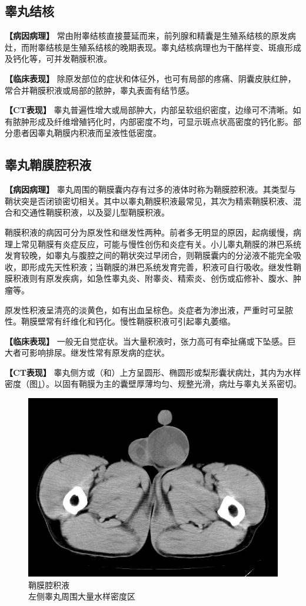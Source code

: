 \subsection{睾丸结核}

\textbf{【病因病理】}
常由附睾结核直接蔓延而来，前列腺和精囊是生殖系结核的原发病灶，而附睾结核是生殖系结核的晚期表现。睾丸结核病理也为干酪样变、斑痕形成及钙化等，可并发鞘膜积液。

\textbf{【临床表现】}
除原发部位的症状和体征外，也可有局部的疼痛、阴囊皮肤红肿，常合并鞘膜积液或局部的脓肿，睾丸表面有结节感。

\textbf{【CT表现】}
睾丸普遍性增大或局部肿大，内部呈软组织密度，边缘可不清晰。如有脓肿形成及纤维增殖钙化时，内部密度不均，可显示斑点状高密度的钙化影。部分患者因睾丸鞘膜内积液而呈液性低密度。

\subsection{睾丸鞘膜腔积液}

\textbf{【病因病理】}
睾丸周围的鞘膜囊内存有过多的液体时称为鞘膜腔积液。其类型与鞘状突是否闭锁密切相关。其中以睾丸鞘膜积液最常见，其次为精索鞘膜积液、混合和交通性鞘膜积液，以及婴儿型鞘膜积液。

鞘膜积液的病因可分为原发性和继发性两种。前者多无明显的原因，起病缓慢，病理上常见鞘膜有炎症反应，可能与慢性创伤和炎症有关。小儿睾丸鞘膜的淋巴系统发育较晚，如睾丸与腹腔之间的鞘状突过早闭合，则鞘膜囊内的分泌液不能完全吸收，即形成先天性积液；当鞘膜的淋巴系统发育完善，积液可自行吸收。继发性鞘膜积液则有原发疾病，如急性睾丸炎、附睾炎、精索炎、创伤或疝修补、腹水、肿瘤等。

原发性积液呈清亮的淡黄色，如有出血呈棕色。炎症者为渗出液，严重时可呈脓性。鞘膜壁常有纤维化和钙化。慢性鞘膜积液可引起睾丸萎缩。

\textbf{【临床表现】}
一般无自觉症状。当大量积液时，张力高可有牵扯痛或下坠感。巨大者可影响排尿。继发性常有原发病的症状。

\textbf{【CT表现】}
睾丸侧方或（和）上方呈圆形、椭圆形或梨形囊状病灶，其内为水样密度（图\ref{fig21-6}）。以固有鞘膜为主的囊壁厚薄均匀、规整光滑，病灶与睾丸关系密切。

\begin{figure}[!htbp]
 \centering
 \includegraphics[width=.7\textwidth,height=\textheight,keepaspectratio]{./images/Image00402.jpg}
 \captionsetup{justification=centering}
 \caption{鞘膜腔积液\\{\small 左侧睾丸周围大量水样密度区}}
 \label{fig21-6}
  \end{figure} 

